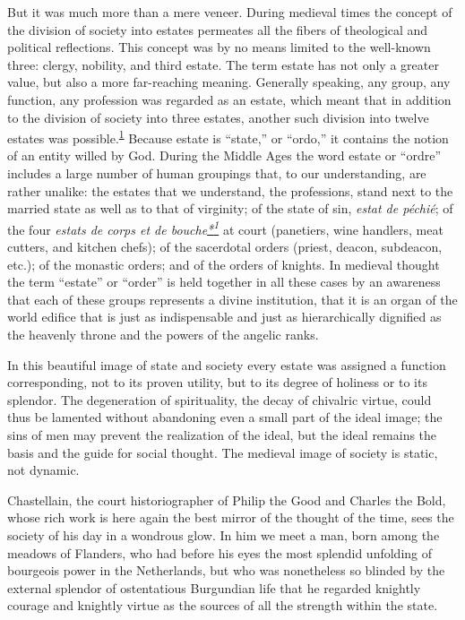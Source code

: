 But it was much more than a mere veneer. During medieval times the
concept of the division of society into estates permeates all the fibers
of theological and political reflections. This concept was by no means
limited to the well-known three: clergy, nobility, and third estate. The
term estate has not only a greater value, but also a more far-reaching
meaning. Generally speaking, any group, any function, any profession was
regarded as an estate, which meant that in addition to the division of
society into three estates, another such division into twelve estates
was
possible.\textsuperscript{\protect\hypertarget{10_Chapter_Three__THE_HEROIC_DREAM.xhtmlux5cux23id_1929}{\protect\hyperlink{23_NOTES.xhtmlux5cux23id_1930}{1}}}
Because estate is ``state,'' or ``ordo,'' it contains the notion of an
entity willed by God. During the Middle Ages the word estate or
``ordre'' includes a large number of human groupings that, to our
understanding, are rather unalike: the estates that we understand, the
professions, stand next to the married state as well as to that of
virginity; of the state of sin, \emph{estat de péchié}; of the four
\emph{estats de corps et de
bouche\protect\hypertarget{10_Chapter_Three__THE_HEROIC_DREAM.xhtmlux5cux23id_2465}{\protect\hyperlink{23_NOTES.xhtmlux5cux23id_2466}{*\textsuperscript{1}}}}
at court (panetiers, wine handlers, meat cutters, and kitchen chefs); of
the sacerdotal orders (priest, deacon, subdeacon, etc.); of the monastic
orders; and of the orders of knights. In medieval thought the term
``estate'' or ``order'' is held together in all these cases by an
awareness that each of these groups represents a divine institution,
that it is an organ of the world edifice that is just as indispensable
and just as hierarchically dignified as the heavenly throne and the
powers of the angelic ranks.

\protect\hypertarget{10_Chapter_Three__THE_HEROIC_DREAM.xhtmlux5cux23page_63}{}{}In
this beautiful image of state and society every estate was assigned a
function corresponding, not to its proven utility, but to its degree of
holiness or to its splendor. The degeneration of spirituality, the decay
of chivalric virtue, could thus be lamented without abandoning even a
small part of the ideal image; the sins of men may prevent the
realization of the ideal, but the ideal remains the basis and the guide
for social thought. The medieval image of society is static, not
dynamic.

Chastellain, the court historiographer of Philip the Good and Charles
the Bold, whose rich work is here again the best mirror of the thought
of the time, sees the society of his day in a wondrous glow. In him we
meet a man, born among the meadows of Flanders, who had before his eyes
the most splendid unfolding of bourgeois power in the Netherlands, but
who was nonetheless so blinded by the external splendor of ostentatious
Burgundian life that he regarded knightly courage and knightly virtue as
the sources of all the strength within the state.


